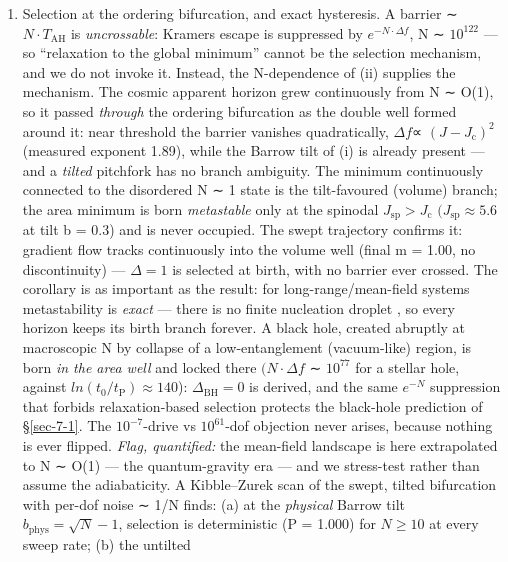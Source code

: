\documentclass[aps,prd,preprint,nofootinbib,superscriptaddress]{revtex4-2}
\providecommand{\tightlist}{\setlength{\itemsep}{0pt}\setlength{\parskip}{0pt}}
\begin{document}
\begin{enumerate}
\def\labelenumi{(\roman{enumi})}
\setcounter{enumi}{2}
\tightlist
\item
  Selection at the ordering bifurcation, and exact hysteresis. A barrier
  ∼ \(N\cdot T_\mathrm{AH}\) is \emph{uncrossable}: Kramers escape is
  suppressed by \(e^{-N\cdot \Delta f}\), N ∼ \(10^{122}\) --- so
  ``relaxation to the global minimum'' cannot be the selection
  mechanism, and we do not invoke it. Instead, the N-dependence of (ii)
  supplies the mechanism. The cosmic apparent horizon grew continuously
  from N ∼ O(1), so it passed \emph{through} the ordering bifurcation as
  the double well formed around it: near threshold the barrier vanishes
  quadratically, \(\Delta f\)∝ \((J - J_{\mathrm{c}})^{2}\) (measured
  exponent 1.89), while the Barrow tilt of (i) is already present ---
  and a \emph{tilted} pitchfork has no branch ambiguity. The minimum
  continuously connected to the disordered N ∼ 1 state is the
  tilt-favoured (volume) branch; the area minimum is born
  \emph{metastable} only at the spinodal
  \(J_{\mathrm{sp}} > J_{\mathrm{c}}\) \((J_{\mathrm{sp}} \approx  5.6\)
  at tilt b = 0.3) and is never occupied. The swept trajectory confirms
  it: gradient flow tracks continuously into the volume well (final m =
  1.00, no discontinuity) --- \(\Delta  = 1\) is selected at birth, with
  no barrier ever crossed. The corollary is as important as the result:
  for long-range/mean-field systems metastability is \emph{exact} ---
  there is no finite nucleation droplet \cite{PenroseLebowitz1971}, so
  every horizon keeps its birth branch forever. A black hole, created
  abruptly at macroscopic N by collapse of a low-entanglement
  (vacuum-like) region, is born \emph{in the area well} and locked there
  \((N\cdot \Delta f\) ∼ \(10^{77}\) for a stellar hole, against
  \(ln(t_{0}/t_{\mathrm{P}}) \approx  140\)):
  \(\Delta _\mathrm{BH} = 0\) is derived, and the same \(e^{-N}\)
  suppression that forbids relaxation-based selection protects the
  black-hole prediction of §\ref{sec-7-1}. The \(10^{-7}\)-drive vs
  \(10^{61}\)-dof objection never arises, because nothing is ever
  flipped. \emph{Flag, quantified:} the mean-field landscape is here
  extrapolated to N ∼ O(1) --- the quantum-gravity era --- and we
  stress-test rather than assume the adiabaticity. A Kibble--Zurek scan
  of the swept, tilted bifurcation with per-dof noise ∼ 1/N finds: (a)
  at the \emph{physical} Barrow tilt
  \(b_{\mathrm{phys}} = \surd N - 1\), selection is deterministic (P =
  1.000) for \(N \geq  10\) at every sweep rate; (b) the untilted

\end{enumerate}
\end{document}
